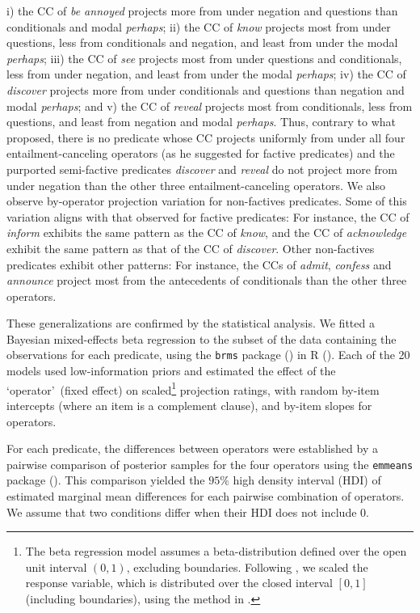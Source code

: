 \documentclass[a4paper,12pt,twoside]{article}
\begin{document}
    i) the CC of \emph{be annoyed} projects more from under negation and questions than conditionals and modal {\em perhaps}; ii) the CC of \emph{know} projects most from under questions, less from conditionals and negation, and least from under the modal {\em perhaps}; iii) the CC of \emph{see} projects most from under questions and conditionals, less from under negation, and least from under the modal \emph{perhaps}; iv) the CC of  \emph{discover} projects more from under conditionals and questions than negation and modal {\em perhaps}; and v) the CC of \emph{reveal} projects most from conditionals, less from questions, and least from negation and modal \emph{perhaps}. Thus, contrary to what \citealt{karttunen_observations_1971} proposed, there is no predicate whose CC projects uniformly from under all four entailment-canceling operators (as he suggested for factive predicates) and the purported semi-factive predicates  \emph{discover} and \emph{reveal} do not project more from under negation than the other three entailment-canceling operators. We also observe by-operator projection variation for non-factives predicates. Some of this variation aligns with that observed for factive predicates: For instance, the CC of \emph{inform} exhibits the same pattern as the CC of \emph{know}, and the CC of \emph{acknowledge} exhibit the same pattern as that of the CC of \emph{discover}. Other non-factives predicates exhibit other patterns: For instance, the CCs of \emph{admit}, \emph{confess} and \emph{announce} project most from the antecedents of conditionals than the other three operators. 

    These generalizations are confirmed by the statistical analysis. We fitted a Bayesian mixed-effects beta regression to the subset of the data containing the observations for each predicate, using the \texttt{brms} package (\citealt{burkner_brms_2017}) in R (\citealt{r_core_team_r_2014}). Each of the 20 models used low-information priors and estimated the effect of the \lq operator\rq\ (fixed effect) on scaled\footnote{The beta regression model assumes a beta-distribution defined over the open unit interval $(0,1)$, excluding boundaries. Following \citet{degen_are_2022}, we scaled the response variable, which is distributed over the closed interval $[0,1]$ (including boundaries), using the method in \citealt{smithson_better_2006}.} projection ratings, with random by-item intercepts (where an item is a complement clause), and by-item slopes for operators.

    For each predicate, the differences between operators were established by a pairwise comparison of posterior samples for the four operators using the \texttt{emmeans} package (\citealt{lenth_emmeans_2024}). This comparison yielded the $95\%$ high density interval (HDI) of estimated marginal mean differences for each pairwise combination of operators. We assume that two conditions differ when their HDI does not include $0$.
\end{document}
